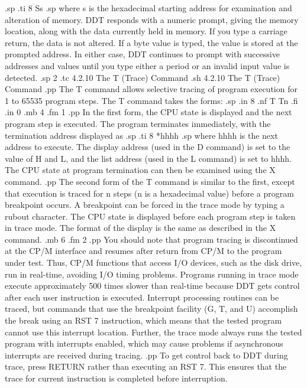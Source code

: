 .sp 
.ti 8
Ss
.sp
where s is the hexadecimal starting address for examination and 
alteration of memory.  DDT responds with a numeric prompt, giving 
the memory location, along with the data currently held in 
memory.  If you type a carriage return, the data is 
not altered.  If a byte value is typed, the value is stored at 
the prompted address.  In either case, DDT continues to prompt 
with successive addresses and values until you type either a period 
or an invalid input value is detected.
.sp 2
.tc         4.2.10 The T (Trace) Command
.sh
4.2.10  The T (Trace) Command
.pp
The T command allows selective tracing of program execution for 1 
to 65535 program steps.  The T command takes the forms:
.sp
.in 8
.nf
T
Tn
.fi
.in 0
.mb 4
.fm 1
.pp
In the first form, the CPU state is displayed and the next 
program step is executed.  The program terminates immediately, 
with the termination address displayed as
.sp
.ti 8
*hhhh
.sp
where hhhh is the next address to execute.  The display address 
(used in the D command) is set to the value of H and L, and the 
list address (used in the L command) is set to hhhh.  The CPU 
state at program termination can then be examined using the X 
command.
.pp
The second form of the T command is similar to the first, except 
that execution is traced for n steps (n is a hexadecimal value) 
before a program breakpoint occurs.  A breakpoint can be forced 
in the trace mode by typing a rubout character.  The CPU state is 
displayed before each program step is taken in trace mode.  The 
format of the display is the same as described in the X command.
.mb 6
.fm 2
.pp
You should note that program tracing is discontinued at the 
CP/M interface and resumes after return from CP/M to the program 
under test.  Thus, CP/M functions that access I/O devices, such 
as the disk drive, run in real-time, avoiding I/O timing 
problems.  Programs running in trace mode execute approximately 
500 times slower than real-time because DDT gets control after each 
user instruction is executed.  Interrupt processing routines can 
be traced, but commands that use the breakpoint facility (G, T, 
and U) accomplish the break using an RST 7 instruction, which 
means that the tested program cannot use this interrupt location.  
Further, the trace mode always runs the tested program with 
interrupts enabled, which may cause problems if asynchronous 
interrupts are received during tracing.
.pp
To get control back to DDT during trace, press RETURN rather than 
executing an RST 7.  This ensures that the trace for current 
instruction is completed before interruption.
